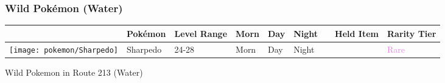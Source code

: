 \subsubsection{Wild Pokémon (Water)}%
\label{ssubsec:WildPokmon(Water)}%
\begin{longtable}{||l l l l l l l l l||}%
\hline%
&Pokémon&Level Range&Morn&Day&Night&&Held Item&Rarity Tier\\%
\hline%
\endhead%
\hline%
\texttt{[image: pokemon/Sharpedo]}&Sharpedo&24{-}28&Morn&Day&Night&&&\textcolor{violet}{%
Rare%
}\\%
\hline%
\end{longtable}%
\caption{Wild Pokemon in Route 213 (Water)}